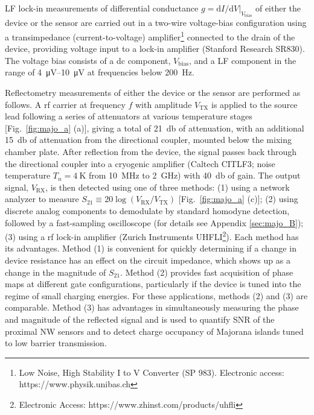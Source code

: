 LF lock-in measurements of differential conductance $g = \textrm{d}I/\textrm{d}V|_{V_\textrm{bias}}$ of either the device or the sensor are carried out in a two-wire voltage-bias configuration using a transimpedance (current-to-voltage) amplifier\footnote{Low Noise, High Stability I to V Converter (SP 983). Electronic access: https://www.physik.unibas.ch} connected to the drain of the device, providing voltage input to a lock-in amplifier (Stanford Research SR830). The voltage bias consists of a dc component, $V_\textrm{bias}$, and a LF component in the range of \SIrange{4}{10}{\micro\volt} at frequencies below \SI{200}{\hertz}.

Reflectometry measurements of either the device or the sensor are performed as follows. A rf carrier at frequency $f$ with amplitude $V_\textrm{TX}$ is applied to the source lead following a series of attenuators at various temperature stages [Fig.~\ref{fig:majo_a} (a)], giving a total of \SI{21}{\decibel} of attenuation, with an additional \SI{15}{\decibel} of attenuation from the directional coupler, mounted below the mixing chamber plate. After reflection from the device, the signal passes back through the directional coupler into a cryogenic amplifier (Caltech CITLF3; noise temperature $T_{n} =  \SI{4}{\kelvin}$ from \SI{10}{\mega\hertz} to \SI{2}{\giga\hertz}) with \SI{+40}{\decibel} of gain.  The output signal, $V_\textrm{RX}$, is then detected using one of three methods: (1) using a network analyzer to measure $S_{21}\equiv 20 \log (V_\textrm{RX}/V_\textrm{TX})$ [Fig.~\ref{fig:majo_a} (c)]; (2) using discrete analog components to demodulate by standard homodyne detection, followed by a fast-sampling oscilloscope (for details see Appendix \ref{sec:majo_B}); (3) using a rf lock-in amplifier (Zurich Instruments UHFLI\footnote{Electronic Access: https://www.zhinst.com/products/uhfli}). Each method has its advantages. Method (1) is convenient for quickly determining  if a change in device resistance has an effect on the circuit impedance, which shows up as a change in the magnitude of $S_{21}$. Method (2) provides fast acquisition of phase maps at different gate configurations, particularly if the device is tuned into the regime of small charging energies. For these applications, methods (2) and (3) are comparable. Method (3) has advantages in simultaneously measuring the phase and magnitude of the reflected signal and is used to quantify SNR of the proximal NW sensors and to detect charge occupancy of Majorana islands tuned to low barrier transmission.

